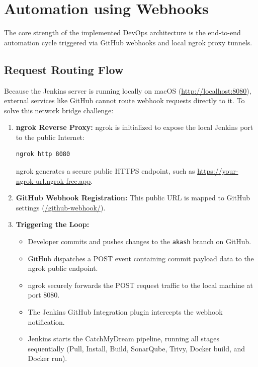 \documentclass[12pt,a4paper]{article}
\begin{document}
\clearpage

\section{Automation using Webhooks}

The core strength of the implemented DevOps architecture is the end-to-end automation cycle triggered via GitHub webhooks and local ngrok proxy tunnels.

\subsection{Request Routing Flow}
Because the Jenkins server is running locally on macOS (\url{http://localhost:8080}), external services like GitHub cannot route webhook requests directly to it. To solve this network bridge challenge:
\begin{enumerate}
    \item \textbf{ngrok Reverse Proxy:} ngrok is initialized to expose the local Jenkins port to the public Internet:
    \begin{lstlisting}[language=bash]
    ngrok http 8080
    \end{lstlisting}
    ngrok generates a secure public HTTPS endpoint, such as \url{https://your-ngrok-url.ngrok-free.app}.
    \item \textbf{GitHub Webhook Registration:} This public URL is mapped to GitHub settings (\url{/github-webhook/}).
    \item \textbf{Triggering the Loop:}
    \begin{itemize}
        \item Developer commits and pushes changes to the \texttt{akash} branch on GitHub.
        \item GitHub dispatches a POST event containing commit payload data to the ngrok public endpoint.
        \item ngrok securely forwards the POST request traffic to the local machine at port 8080.
        \item The Jenkins GitHub Integration plugin intercepts the webhook notification.
        \item Jenkins starts the CatchMyDream pipeline, running all stages sequentially (Pull, Install, Build, SonarQube, Trivy, Docker build, and Docker run).
    \end{itemize}
\end{enumerate}
\end{document}
